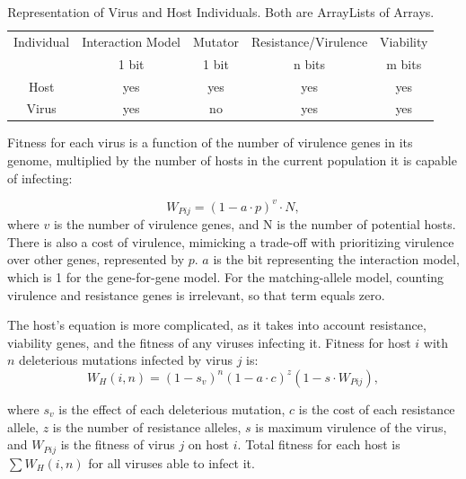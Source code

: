 \documentclass[11pt, oneside]{article}
\begin{document}
\begin{table}[H]
	\begin{center}
	 \begin{tabular}{||c c c c c||} 
	 \hline
	Individual & Interaction Model & Mutator & Resistance/Virulence & Viability\\ 
	& 1 bit & 1 bit & n bits & m bits\\
	 \hline\hline
 	Host & yes & yes & yes & yes\\
	 \hline
 	Virus & yes & no & yes & yes\\
	 \hline
	\end{tabular}
	\caption{Representation of Virus and Host Individuals. Both are ArrayLists of Arrays.}
	\label{table:1}
	\end{center}
\end{table}

Fitness for each virus is a function of the number of virulence genes in its genome, multiplied by the number of hosts in the current population it is capable of infecting:

\begin{equation}
W_{Pij} = (1-a\cdot p)^v\cdot N,
\end{equation}
where $v$ is the number of virulence genes, and N is the number of potential hosts. There is also a cost of virulence, mimicking a trade-off with prioritizing virulence over other genes, represented by $p$. $a$ is the bit representing the interaction model, which is 1 for the gene-for-gene model. For the matching-allele model, counting virulence and resistance genes is irrelevant, so that term equals zero.

The host's equation is more complicated, as it takes into account resistance, viability genes, and the fitness of any viruses infecting it. Fitness for host $i$ with $n$ deleterious mutations infected by virus $j$ is:
\begin{equation}
W_{H}(i,n) = (1-s_{v})^n(1-a\cdot c)^z(1-s\cdot W_{Pij}),
\end{equation}

where $s_{v}$ is the effect of each deleterious mutation, $c$ is the cost of each resistance allele, $z$ is the number of resistance alleles, $s$ is maximum virulence of the virus, and $W_{Pij}$ is the fitness of virus $j$ on host $i$. Total fitness for each host is $\sum W_{H}(i,n)$ for all viruses able to infect it. 
\end{document}
